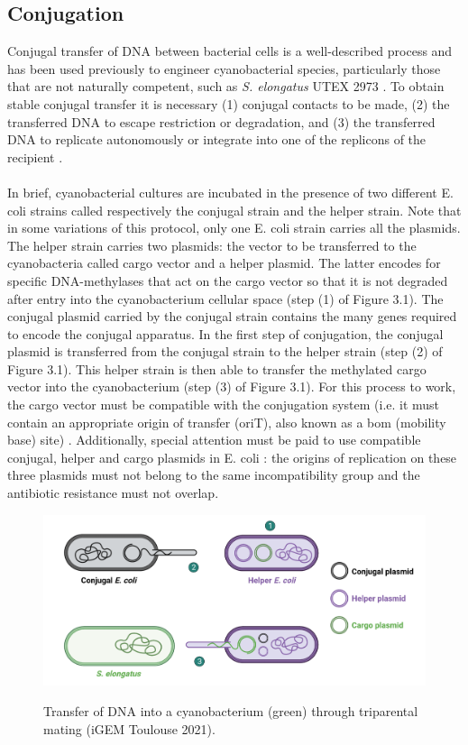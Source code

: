 \subsection{Conjugation}
Conjugal transfer of DNA between bacterial cells is a well-described process and has been used previously to engineer cyanobacterial species, particularly those that are not naturally competent, such as \textit{S. elongatus} UTEX 2973 \parencite{Elhai1988} \parencite{Yu2015}. To obtain stable conjugal transfer it is necessary (1) conjugal contacts to be made, (2) the transferred DNA to escape restriction or degradation, and (3) the transferred DNA to replicate autonomously or integrate into one of the replicons of the recipient \parencite{Elhai1988} \parencite{Gale2019}. \\ \\
In brief, cyanobacterial cultures are incubated in the presence of two different E. coli strains called respectively the conjugal strain and the helper strain. Note that in some variations of this protocol, only one E. coli strain carries all the plasmids. The helper strain carries two plasmids: the vector to be transferred to the cyanobacteria called cargo vector and a helper plasmid. The latter encodes for specific DNA-methylases that act on the cargo vector so that it is not degraded after entry into the cyanobacterium cellular space (step (1) of Figure 3.1). The conjugal plasmid carried by the conjugal strain contains the many genes required to encode the conjugal apparatus. In the first step of conjugation, the conjugal plasmid is transferred from the conjugal strain to the helper strain (step (2) of Figure 3.1). This helper strain is then able to transfer the methylated cargo vector into the cyanobacterium (step (3) of Figure 3.1). For this process to work, the cargo vector must be compatible with the conjugation system (i.e. it must contain an appropriate origin of transfer (oriT), also known as a bom (mobility base) site) \parencite{Elhai1988} \parencite{Gale2019}. Additionally, special attention must be paid to use compatible conjugal, helper and cargo plasmids in E. coli : the origins of replication on these three plasmids must not belong to the same incompatibility group and the antibiotic resistance must not overlap.

\begin{figure}[!htbp]
    \centering
    \includegraphics[width=\textwidth]{images/chap3/cyano/image1.png}
    \label{fig:ch3cyano01}
    \caption{Transfer of DNA into a cyanobacterium (green) through triparental mating (iGEM Toulouse 2021).} 
\end{figure}
\FloatBarrier

